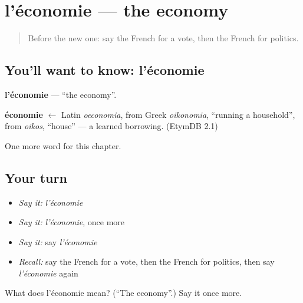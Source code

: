 \section[l'économie]{l'économie — the economy}

\label{lesson:FR-C248-economie}



\begin{quote}
Before the new one: say the French for a vote, then the French for politics.
\end{quote}

\subsection*{You'll want to know: l'économie}
\textbf{l'économie} — \textquotedblleft{}the economy\textquotedblright{}.

\begin{cousinweb}
\textbf{économie} $\leftarrow$ Latin \emph{oeconomia}, from Greek \emph{oikonomia}, \textquotedblleft{}running a household\textquotedblright{}, from \emph{oikos}, \textquotedblleft{}house\textquotedblright{} — a learned borrowing. (EtymDB 2.1)
\end{cousinweb}

\begin{grammarlens}[title={What you've built}]
One more word for this chapter.
\end{grammarlens}

\subsection*{Your turn}
\begin{itemize}
\raggedright
  \item \emph{Say it:} \emph{l'économie}
  \item \emph{Say it:} \emph{l'économie}, once more
  \item \emph{Say it:} say \emph{l'économie}
  \item \emph{Recall:} say the French for a vote, then the French for politics, then say \emph{l'économie} again
\end{itemize}

\begin{tcolorbox}[breakable,colback=teal!4,colframe=teal!35!black,title={Before you move on}]
What does l'économie mean? (\textquotedblleft{}The economy\textquotedblright{}.) Say it once more.
\end{tcolorbox}
